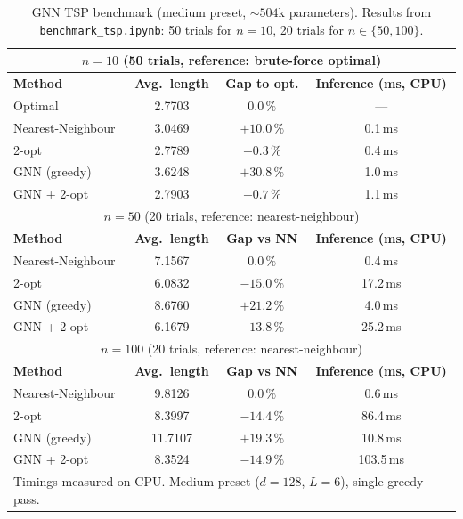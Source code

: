 \documentclass[12pt,a4paper]{article}
\begin{document}
\begin{table}[H]
\centering
{}
\begin{tabularx}{\linewidth}{Xccc}
\toprule
\multicolumn{4}{c}{$n = 10$ \quad (50 trials, reference: brute-force optimal)} \\
\midrule
\textbf{Method} & \textbf{Avg.\ length} & \textbf{Gap to opt.} &
  \textbf{Inference (ms, CPU)} \\
\midrule
Optimal           & 2.7703 & $0.0\,\%$  & --- \\
Nearest-Neighbour & 3.0469 & $+10.0\,\%$ & 0.1\,ms \\
2-opt             & 2.7789 & $+0.3\,\%$  & 0.4\,ms \\
GNN (greedy)      & 3.6248 & $+30.8\,\%$ & 1.0\,ms \\
GNN + 2-opt       & 2.7903 & $+0.7\,\%$  & 1.1\,ms \\
\midrule
\multicolumn{4}{c}{$n = 50$ \quad (20 trials, reference: nearest-neighbour)} \\
\midrule
\textbf{Method} & \textbf{Avg.\ length} & \textbf{Gap vs NN} &
  \textbf{Inference (ms, CPU)} \\
\midrule
Nearest-Neighbour & 7.1567 & $0.0\,\%$   & 0.4\,ms \\
2-opt             & 6.0832 & $-15.0\,\%$ & 17.2\,ms \\
GNN (greedy)      & 8.6760 & $+21.2\,\%$ & 4.0\,ms \\
GNN + 2-opt       & 6.1679 & $-13.8\,\%$ & 25.2\,ms \\
\midrule
\multicolumn{4}{c}{$n = 100$ \quad (20 trials, reference: nearest-neighbour)} \\
\midrule
\textbf{Method} & \textbf{Avg.\ length} & \textbf{Gap vs NN} &
  \textbf{Inference (ms, CPU)} \\
\midrule
Nearest-Neighbour &  9.8126 & $0.0\,\%$   &  0.6\,ms \\
2-opt             &  8.3997 & $-14.4\,\%$ & 86.4\,ms \\
GNN (greedy)      & 11.7107 & $+19.3\,\%$ & 10.8\,ms \\
GNN + 2-opt       &  8.3524 & $-14.9\,\%$ & 103.5\,ms \\
\bottomrule
\multicolumn{4}{l}{\small Timings measured on CPU. Medium preset ($d=128$, $L=6$), single greedy pass.}\\
\end{tabularx}
\caption{GNN TSP benchmark (medium preset, ${\sim}504\mathrm{k}$ parameters).
  Results from \texttt{benchmark\_tsp.ipynb}: 50 trials for $n=10$, 20 trials for $n \in \{50, 100\}$.}
\label{tab:tsp_benchmark}
\end{table}
\end{document}
